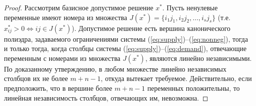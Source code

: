 \documentclass[12pt]{article}
\theoremstyle{definition}
\theoremstyle{plain}
\theoremstyle{definition}
\begin{document}
\begin{proof}
  Рассмотрим базисное допустимое решение $x^*$. Пусть ненулевые переменные имеют номера
  из множества $J(x^*) = \{i_1j_1, i_2j_2,\dots,i_sj_s\}$ (т.е. $x^*_{ij} > 0 \iff ij \in J(x^*)$).
  Допустимое решение есть вершина канонического полиэдра, задаваемого ограничениями системы
  (\ref{eq:supply})--(\ref{eq:nonneg}), тогда и только тогда, когда столбцы системы (\ref{eq:supply})--(\ref{eq:demand}),
  отвечающие переменным с номерами из множества $J(x^*)$, являются линейно независимыми.
  По доказанному утверждению, в любом множестве линейно независимых столбцов
  их не более $m + n - 1$, откуда вытекает требуемое. Действительно, если предположить, что в вершине
  более $m + n - 1$ переменных положительны, то линейная независимость столбцов, отвечающих им, невозможна.
\end{proof}
\end{document}
